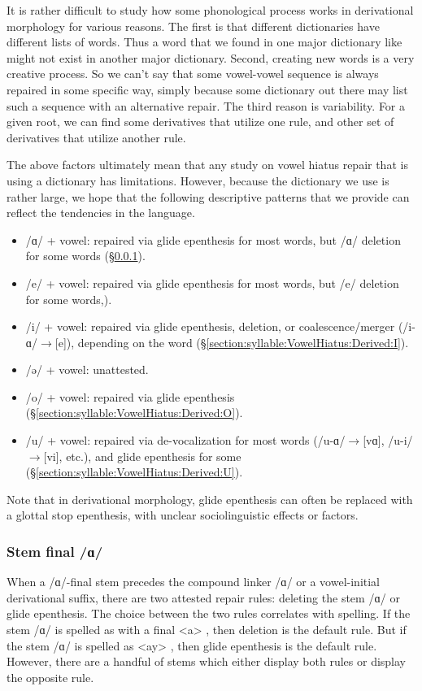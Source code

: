 {	It is rather difficult to study how some phonological process works in derivational morphology  for various reasons. The first is that different dictionaries have different lists of words. Thus a word that we found in one major dictionary like \citeauthor{kouyoumdjian-1970-DictionaryArmenianEnglish} might not exist in another major dictionary. Second, creating new words is a very creative process. So we can't say that some vowel-vowel sequence is always repaired in some specific way, simply because some dictionary out there may list such a sequence with an alternative repair. The third reason is variability. For a given root, we can find some derivatives that utilize one rule, and other set of derivatives that utilize another rule. 
	
	The above factors ultimately mean that any study on vowel hiatus repair that is using a dictionary has limitations. However, because the dictionary we use is rather large, we hope that the following descriptive patterns that we provide can reflect the tendencies in the language.
	
	\begin{itemize}[noitemsep,topsep=0pt]
		\item /ɑ/ + vowel: repaired via glide epenthesis for most words, but /ɑ/ deletion for some words (\S\ref{section:syllable:VowelHiatus:Derived:A}).
		\item /e/ + vowel: repaired via glide epenthesis for most words, but /e/ deletion for some words,).
		\item /i/ + vowel: repaired via glide epenthesis, deletion, or coalescence/merger (/i-ɑ/$\rightarrow$[e]), depending on the word  (\S\ref{section:syllable:VowelHiatus:Derived:I}).
		\item /ə/ + vowel: unattested. 
		\item /o/ + vowel: repaired via glide epenthesis  (\S\ref{section:syllable:VowelHiatus:Derived:O}).
		\item /u/ + vowel: repaired via de-vocalization for most words  (/u-ɑ/$\rightarrow$[vɑ], /u-i/$\rightarrow$[vi], etc.), and glide epenthesis for some    (\S\ref{section:syllable:VowelHiatus:Derived:U}).
		
	\end{itemize}
	
	Note that in derivational morphology,   glide epenthesis can often be replaced with a glottal stop epenthesis, with unclear sociolinguistic effects or factors. 
	
	
	\subsubsection{Stem final /ɑ/}\label{section:syllable:VowelHiatus:Derived:A}
	When a /ɑ/-final stem precedes   the compound linker /ɑ/ or a vowel-initial derivational suffix, there are two attested repair rules: deleting  the stem /ɑ/ or glide epenthesis. The choice between the two rules correlates with spelling. If  the stem /ɑ/ is spelled as with a final <a> , then deletion is the default rule. But if the stem /ɑ/ is spelled as <ay> , then glide epenthesis is the default rule. However, there are a handful of stems which either display both rules or  display the opposite rule. 
	
}
